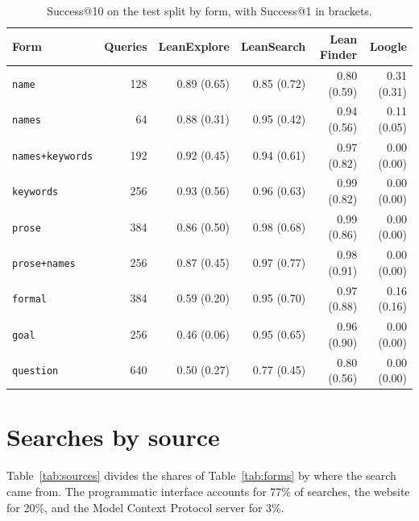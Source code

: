 \documentclass{article}
\newcommand{\thead}[1]{\textbf{#1}}
\newcommand{\rowrule}{\arrayrulecolor{nBorderLight}\specialrule{0.4pt}{3pt}{3pt}\arrayrulecolor{nBorder}}
\newcommand{\code}[1]{\texttt{\small #1}}
\begin{document}
\begin{table}[H]
\centering\small
\caption{Success@10 on the test split by form, with Success@1 in brackets.}
\label{tab:byform}
\begin{tabular}{@{}lrrrrr@{}}
\toprule
\thead{Form} & \thead{Queries} & \thead{LeanExplore} & \thead{LeanSearch} & \thead{Lean Finder} & \thead{Loogle} \\
\midrule
\code{name} & 128 & 0.89 (0.65) & 0.85 (0.72) & 0.80 (0.59) & 0.31 (0.31) \\
\rowrule
\code{names} & 64 & 0.88 (0.31) & 0.95 (0.42) & 0.94 (0.56) & 0.11 (0.05) \\
\rowrule
\code{names+keywords} & 192 & 0.92 (0.45) & 0.94 (0.61) & 0.97 (0.82) & 0.00 (0.00) \\
\rowrule
\code{keywords} & 256 & 0.93 (0.56) & 0.96 (0.63) & 0.99 (0.82) & 0.00 (0.00) \\
\rowrule
\code{prose} & 384 & 0.86 (0.50) & 0.98 (0.68) & 0.99 (0.86) & 0.00 (0.00) \\
\rowrule
\code{prose+names} & 256 & 0.87 (0.45) & 0.97 (0.77) & 0.98 (0.91) & 0.00 (0.00) \\
\rowrule
\code{formal} & 384 & 0.59 (0.20) & 0.95 (0.70) & 0.97 (0.88) & 0.16 (0.16) \\
\rowrule
\code{goal} & 256 & 0.46 (0.06) & 0.95 (0.65) & 0.96 (0.90) & 0.00 (0.00) \\
\rowrule
\code{question} & 640 & 0.50 (0.27) & 0.77 (0.45) & 0.80 (0.56) & 0.00 (0.00) \\
\bottomrule
\end{tabular}
\end{table}

\section{Searches by source}
\label{app:sources}

Table~\ref{tab:sources} divides the shares of Table~\ref{tab:forms} by where
the search came from. The programmatic interface accounts for 77\% of
searches, the website for 20\%, and the Model Context Protocol server for
3\%.
\end{document}
